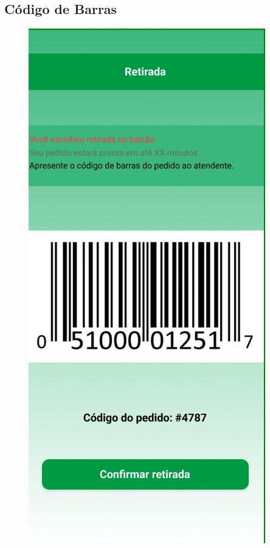 \documentclass[12pt,oneside,a4paper,article]{abntex2}
\begin{document}
 \subsection{Código de Barras}
   \begin{figure}[H]
        \centering
        \includegraphics[width=0.5\linewidth]{imagens-template//telas/qrpagamento.jpg}
        \label{fig:placeholder}
    \end{figure}
    
\end{document}
